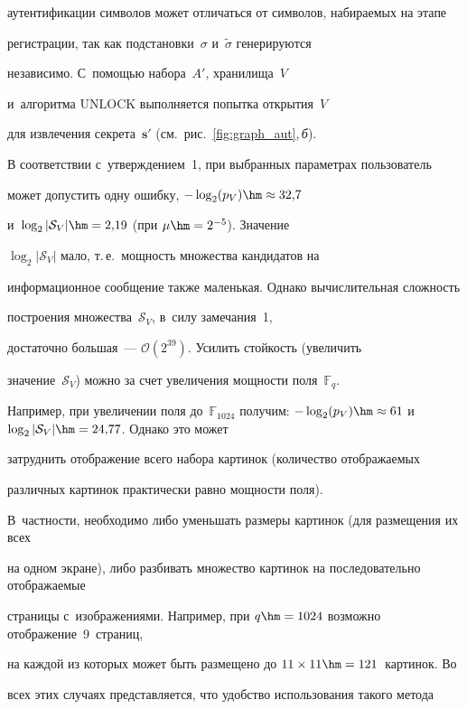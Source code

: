  аутентификации символов может отличаться от символов, набираемых на этапе 


 регистрации, так как подстановки~$\sigma$ и~$\widetilde{\sigma}$ генерируются 


 независимо. С~по\-мощью набора~$A'$, хранилища~$V$ 


 и~алгоритма $\mathrm{UNLOCK}$ выполняется попытка открытия~$V$ 


 для извлечения секрета~$\mathbf{s}'$ (см.\ рис.~\ref{fig:graph_aut},\,\textit{б}).





В соответствии с~утверждением~1, при выбранных параметрах пользователь 


может допустить одну ошибку, $-\log_2 (p_V)  \hm\approx 32{,}7$ 


и~$\log_2|\mathcal{S}_V|\hm=2{,}19$ (при $\mu\hm=2^{-5}$). Значение 


$\log_2|\mathcal{S}_V|$ мало, т.\,е.\ мощ\-ность множества кандидатов на 


информационное сообщение также маленькая. Однако вычислительная сложность 


построения множества~$\mathcal{S}_V$, в~силу замечания~1, 


достаточно большая~--- $\mathcal{O}(2^{39})$. Усилить стойкость (увеличить 


значение~$\mathcal{S}_V$) можно за счет увеличения мощности поля~$\mathbb{F}_q$. 


Например, при увеличении поля до~$\mathbb{F}_{1024}$ получим: $-\log_2 (p_V)


\hm\approx 61$ и~$\log_2|\mathcal{S}_V|\hm=24{,}77$. Однако это может 


затруднить отображение всего набора картинок (количество отображаемых 


различных картинок практически равно мощности поля). 


В~частности, необходимо либо уменьшать размеры картинок (для размещения их всех 


на одном экране), либо разбивать множество картинок на последовательно отображаемые 


страницы с~изображениями. Например, при $q\hm=1024$ возможно отображение~9~страниц, 


на каждой из которых может быть размещено до $11\times 11\hm=121$~картинок. Во 


всех этих случаях представляется, что удобство использования такого метода 


